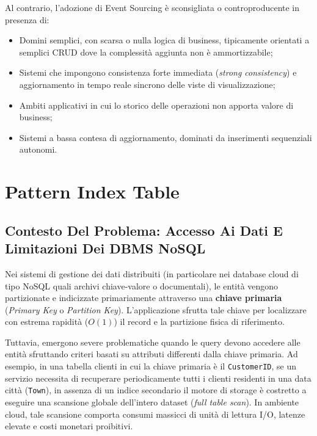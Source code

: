 \documentclass[11pt, a4paper]{article}
\begin{document}
Al contrario, l'adozione di Event Sourcing è sconsigliata o controproducente in presenza di:
\begin{itemize}[noitemsep]
    \item Domini semplici, con scarsa o nulla logica di business, tipicamente orientati a semplici CRUD dove la complessità aggiunta non è ammortizzabile;
    \item Sistemi che impongono consistenza forte immediata (\emph{strong consistency}) e aggiornamento in tempo reale sincrono delle viste di visualizzazione;
    \item Ambiti applicativi in cui lo storico delle operazioni non apporta valore di business;
    \item Sistemi a bassa contesa di aggiornamento, dominati da inserimenti sequenziali autonomi.
\end{itemize}

\newpage


\section{Pattern Index Table}

\subsection{Contesto Del Problema: Accesso Ai Dati E Limitazioni Dei DBMS NoSQL}

Nei sistemi di gestione dei dati distribuiti (in particolare nei database cloud di tipo NoSQL quali archivi chiave-valore o documentali), le entità vengono partizionate e indicizzate primariamente attraverso una \textbf{chiave primaria} (\emph{Primary Key} o \emph{Partition Key}). L'applicazione sfrutta tale chiave per localizzare con estrema rapidità ($O(1)$) il record e la partizione fisica di riferimento.

Tuttavia, emergono severe problematiche quando le query devono accedere alle entità sfruttando criteri basati su attributi differenti dalla chiave primaria. Ad esempio, in una tabella clienti in cui la chiave primaria è il \texttt{CustomerID}, se un servizio necessita di recuperare periodicamente tutti i clienti residenti in una data città (\texttt{Town}), in assenza di un indice secondario il motore di storage è costretto a eseguire una scansione globale dell'intero dataset (\emph{full table scan}). In ambiente cloud, tale scansione comporta consumi massicci di unità di lettura I/O, latenze elevate e costi monetari proibitivi.
\end{document}
